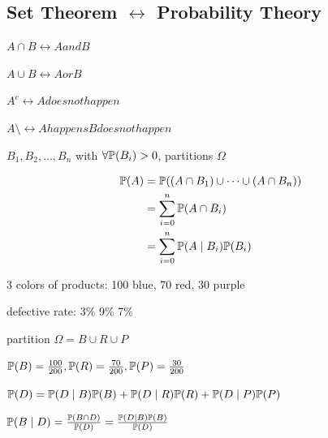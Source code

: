\subsection*{Set Theorem $\longleftrightarrow$ Probability Theory}

$A\cap B \longleftrightarrow A and B$

$A \cup B \longleftrightarrow A or B$

$A^c \longleftrightarrow A does not happen$

$A\setminus \longleftrightarrow A happens B does not happen$

\begin{theorem}
    $B_1, B_2, \dots, B_n$ with $\forall \P(B_i)>0$, partitions $\Omega$

    \begin{align*}
        \P(A)&=\P((A\cap B_1)\cup \dots \cup (A \cap B_n))\\
             &=\sum\limits_{i=0}^n \P(A \cap B_i)\\
             &=\sum\limits_{i=0}^n \P(A \mid B_i)\P(B_i)
    \end{align*}
\end{theorem}

\begin{example}
    3 colors of products: 100 blue, 70 red, 30 purple
    
    defective rate: 3\% 9\% 7\%

    partition $\Omega=B\cup R\cup P$

    $\P(B)=\frac{100}{200}, \P(R)=\frac{70}{200}, \P(P)=\frac{30}{200}$

    $\P(D)=\P(D\mid B)\P(B)+\P(D \mid R)\P(R)+\P(D \mid P)\P(P)$

    $\P(B \mid D)=\frac{\P(B \cap D)}{\P(D)}=\frac{\P(D\mid B)\P(B)}{\P(D)}$
\end{example}